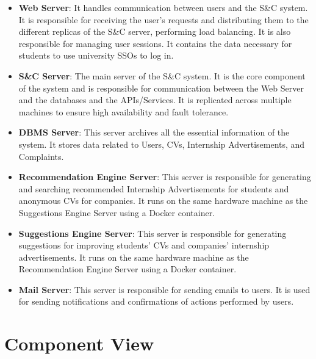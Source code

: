 \begin{itemize}
    \item \textbf{Web Server}: It handles communication between users and the S\&C system. It is responsible for
                                receiving the user's requests and distributing them to the different replicas of the S\&C server,
                                performing load balancing. It is also responsible for managing user sessions.
                                It contains the data necessary for students to use university SSOs to log in.

    \item \textbf{S\&C Server}: The main server of the S\&C system. It is the core component of the system and is responsible
                                for communication between the Web Server and the databases and the APIs/Services.
                                It is replicated across multiple machines to ensure high availability and fault tolerance.

    \item \textbf{DBMS Server}: This server archives all the essential information of the system.
                                It stores data related to Users, CVs, Internship Advertisements, and Complaints.
    
    \item \textbf{Recommendation Engine Server}: This server is responsible for generating and searching recommended Internship Advertisements for students and anonymous CVs for companies.
                                                It runs on the same hardware machine as the Suggestions Engine Server using a Docker container.

    \item \textbf{Suggestions Engine Server}: This server is responsible for generating suggestions for improving students' CVs and companies' internship advertisements.
                                            It runs on the same hardware machine as the Recommendation Engine Server using a Docker container.

    \item \textbf{Mail Server}: This server is responsible for sending emails to users. It is used for sending notifications and confirmations of actions performed by users.

\end{itemize}                                

\section{Component View}
\label{sub:component-view}

